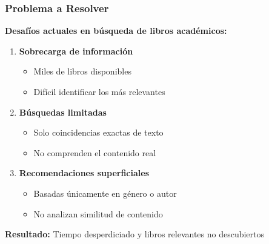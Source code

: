 \documentclass[aspectratio=169]{beamer}
\begin{document}
\begin{frame}
\frametitle{Problema a Resolver}

\textbf{Desafíos actuales en búsqueda de libros académicos:}

\begin{enumerate}
\item \textbf{Sobrecarga de información}
  \begin{itemize}
  \item Miles de libros disponibles
  \item Difícil identificar los más relevantes
  \end{itemize}

\item \textbf{Búsquedas limitadas}
  \begin{itemize}
  \item Solo coincidencias exactas de texto
  \item No comprenden el contenido real
  \end{itemize}

\item \textbf{Recomendaciones superficiales}
  \begin{itemize}
  \item Basadas únicamente en género o autor
  \item No analizan similitud de contenido
  \end{itemize}
\end{enumerate}

\vspace{0.3cm}

\begin{tcolorbox}[colback=red!5, colframe=red!50]
\textbf{Resultado:} Tiempo desperdiciado y libros relevantes no descubiertos
\end{tcolorbox}

\end{frame}
\end{document}
